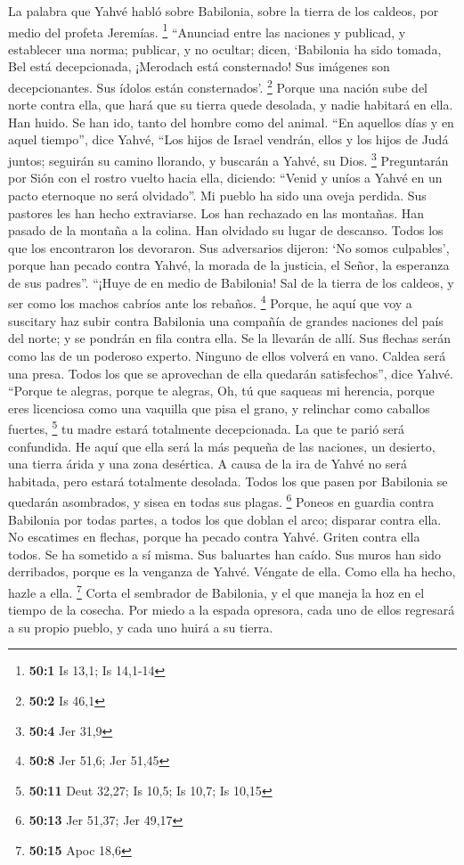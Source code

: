  La palabra que Yahvé habló sobre Babilonia, sobre la
tierra de los caldeos, por medio del profeta Jeremías. \footnote{\textbf{50:1}
  Is 13,1; Is 14,1-14}  ``Anunciad entre las naciones y
publicad, y establecer una norma; publicar, y no ocultar; dicen,
`Babilonia ha sido tomada, Bel está decepcionada, ¡Merodach está
consternado! Sus imágenes son decepcionantes. Sus ídolos están
consternados'. \footnote{\textbf{50:2} Is 46,1}  Porque
una nación sube del norte contra ella, que hará que su tierra quede
desolada, y nadie habitará en ella. Han huido. Se han ido, tanto del
hombre como del animal.  ``En aquellos días y en aquel
tiempo'', dice Yahvé, ``Los hijos de Israel vendrán, ellos y los hijos
de Judá juntos; seguirán su camino llorando, y buscarán a Yahvé, su
Dios. \footnote{\textbf{50:4} Jer 31,9}  Preguntarán por
Sión con el rostro vuelto hacia ella, diciendo: ``Venid y uníos a Yahvé
en un pacto eternoque no será olvidado''.  Mi pueblo ha
sido una oveja perdida. Sus pastores les han hecho extraviarse. Los han
rechazado en las montañas. Han pasado de la montaña a la colina. Han
olvidado su lugar de descanso.  Todos los que los
encontraron los devoraron. Sus adversarios dijeron: `No somos
culpables', porque han pecado contra Yahvé, la morada de la justicia, el
Señor, la esperanza de sus padres''.  ``¡Huye de en medio
de Babilonia! Sal de la tierra de los caldeos, y ser como los machos
cabríos ante los rebaños. \footnote{\textbf{50:8} Jer 51,6; Jer 51,45}
 Porque, he aquí que voy a suscitary haz subir contra
Babilonia una compañía de grandes naciones del país del norte; y se
pondrán en fila contra ella. Se la llevarán de allí. Sus flechas serán
como las de un poderoso experto. Ninguno de ellos volverá en vano.
 Caldea será una presa. Todos los que se aprovechan de
ella quedarán satisfechos'', dice Yahvé.  ``Porque te
alegras, porque te alegras, Oh, tú que saqueas mi herencia, porque eres
licenciosa como una vaquilla que pisa el grano, y relinchar como
caballos fuertes, \footnote{\textbf{50:11} Deut 32,27; Is 10,5; Is 10,7;
  Is 10,15}  tu madre estará totalmente decepcionada. La
que te parió será confundida. He aquí que ella será la más pequeña de
las naciones, un desierto, una tierra árida y una zona desértica.
 A causa de la ira de Yahvé no será habitada, pero estará
totalmente desolada. Todos los que pasen por Babilonia se quedarán
asombrados, y sisea en todas sus plagas. \footnote{\textbf{50:13} Jer
  51,37; Jer 49,17}  Poneos en guardia contra Babilonia
por todas partes, a todos los que doblan el arco; disparar contra ella.
No escatimes en flechas, porque ha pecado contra Yahvé. 
Griten contra ella todos. Se ha sometido a sí misma. Sus baluartes han
caído. Sus muros han sido derribados, porque es la venganza de Yahvé.
Véngate de ella. Como ella ha hecho, hazle a ella. \footnote{\textbf{50:15}
  Apoc 18,6}  Corta el sembrador de Babilonia, y el que
maneja la hoz en el tiempo de la cosecha. Por miedo a la espada
opresora, cada uno de ellos regresará a su propio pueblo, y cada uno
huirá a su tierra.

